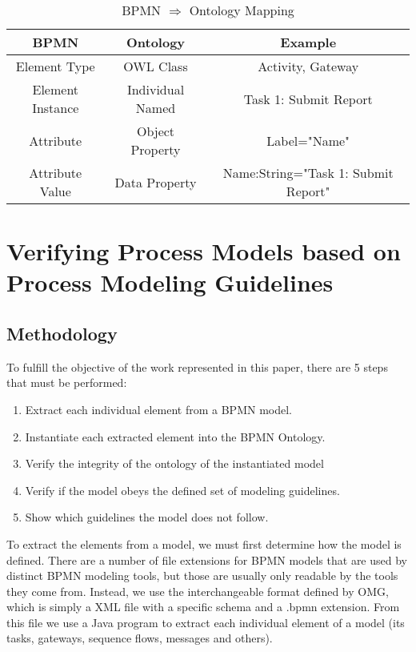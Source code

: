 \documentclass{llncs}
\begin{document}
\begin{table}[h]
	\label{BPMNOntologyMapping}
	\caption{BPMN $\Rightarrow$ Ontology Mapping}
	\centering
	\begin{tabular}{ccc}
		\hline
		BPMN & Ontology & Example \\
		\hline
		Element Type & OWL Class & Activity, Gateway \\
		Element Instance & Individual Named & Task 1: Submit Report \\  
		Attribute & Object Property & Label="Name" \\
		Attribute Value & Data Property & Name:String="Task 1: Submit Report" \\ 
		\hline
	\end{tabular} 
\end{table}


\section{Verifying Process Models based on Process Modeling Guidelines}\label{Methodology}



\subsection{Methodology}
To fulfill the objective of the work represented in this paper, there are 5 steps that must be performed:

\begin{enumerate}
	\item Extract each individual element from a BPMN model.
	\item Instantiate each extracted element into the BPMN Ontology.
	\item Verify the integrity of the ontology of the instantiated model
	\item Verify if the model obeys the defined set of modeling guidelines.
	\item Show which guidelines the model does not follow.
\end{enumerate}

To extract the elements from a model, we must first determine how the model is defined. There are a number of file extensions for BPMN models that are used by distinct BPMN modeling tools, but those are usually only readable by the tools they come from. Instead, we use the interchangeable format defined by OMG, which is simply a XML file with a specific schema and a .bpmn extension. From this file we use a Java program to extract each individual element of a model (its tasks, gateways, sequence flows, messages and others).
\end{document}
